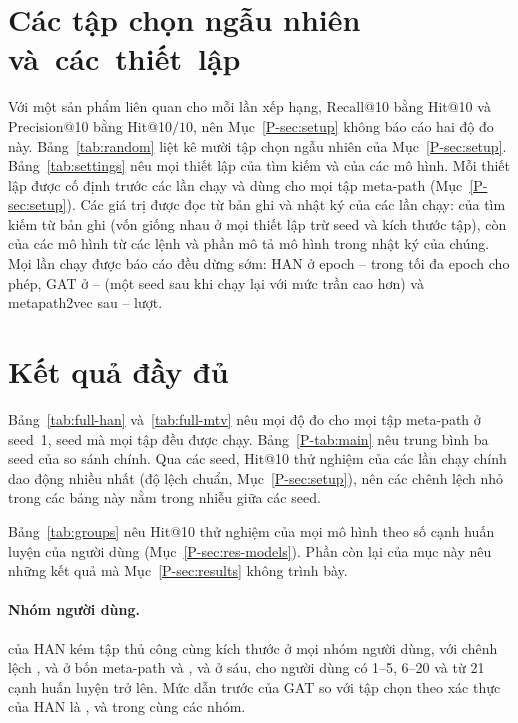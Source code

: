 \section{Các tập chọn ngẫu nhiên và~các~thiết~lập}
\label{app:settings}

Với một sản phẩm liên quan cho mỗi lần xếp hạng, Recall@10 bằng Hit@10 và Precision@10 bằng
Hit@10$/10$, nên Mục~\ref*{P-sec:setup} không báo cáo hai độ đo này. Bảng~\ref{tab:random} liệt kê mười
tập chọn ngẫu nhiên của Mục~\ref*{P-sec:setup}. Bảng~\ref{tab:settings} nêu mọi thiết lập của tìm
kiếm và của các mô hình. Mỗi thiết lập được cố định trước các lần chạy và dùng cho mọi tập meta-path (Mục~\ref*{P-sec:setup}). Các giá trị được đọc từ bản ghi và nhật ký của các lần chạy: của tìm
kiếm từ  bản ghi (vốn giống nhau ở mọi thiết lập trừ seed và kích thước
tập), còn của các mô hình từ các lệnh và phần mô tả mô hình trong nhật ký của chúng. Mọi lần chạy được báo
cáo đều dừng sớm: HAN ở epoch -- trong tối đa
 epoch cho phép, GAT ở -- (một seed sau khi
chạy lại với mức trần cao hơn) và metapath2vec sau -- lượt.




\section{Kết quả đầy đủ}
\label{app:full}

Bảng~\ref{tab:full-han} và~\ref{tab:full-mtv} nêu mọi độ đo cho mọi tập meta-path ở seed~1, seed mà
mọi tập đều được chạy. Bảng~\ref*{P-tab:main} nêu trung bình ba seed của so sánh chính. Qua các seed,
Hit@10 thử nghiệm của các lần chạy chính dao động nhiều nhất  (độ lệch chuẩn,
Mục~\ref*{P-sec:setup}), nên các chênh lệch nhỏ trong các bảng này nằm trong nhiễu giữa các seed.

Bảng~\ref{tab:groups} nêu Hit@10 thử nghiệm của mọi mô hình theo số cạnh huấn luyện của người dùng
(Mục~\ref*{P-sec:res-models}). Phần còn lại của mục này nêu những kết quả mà
Mục~\ref*{P-sec:results} không trình bày.

\paragraph{Nhóm người dùng.}  của HAN kém tập thủ công cùng kích thước ở mọi nhóm người
dùng, với chênh lệch ,  và  ở
bốn meta-path và ,  và  ở sáu,
cho người dùng có 1--5, 6--20 và từ 21 cạnh huấn luyện trở lên. Mức dẫn trước của GAT so với tập
chọn theo xác thực của HAN là ,  và  trong cùng
các nhóm.

